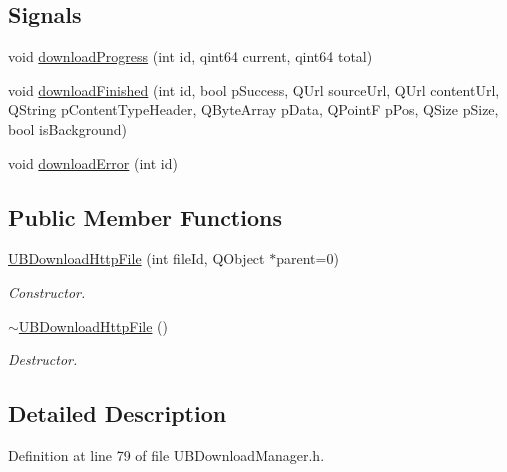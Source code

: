 \subsection*{Signals}
\begin{DoxyCompactItemize}
\item 
void \hyperlink{class_u_b_download_http_file_abf929cee75fc3b5401298b6757125480}{download\-Progress} (int id, qint64 current, qint64 total)
\item 
void \hyperlink{class_u_b_download_http_file_acd45974a11a39587251a7893894d85ee}{download\-Finished} (int id, bool p\-Success, Q\-Url source\-Url, Q\-Url content\-Url, Q\-String p\-Content\-Type\-Header, Q\-Byte\-Array p\-Data, Q\-Point\-F p\-Pos, Q\-Size p\-Size, bool is\-Background)
\item 
void \hyperlink{class_u_b_download_http_file_af8ea0f0a88ff715b70c6463906691fca}{download\-Error} (int id)
\end{DoxyCompactItemize}
\subsection*{Public Member Functions}
\begin{DoxyCompactItemize}
\item 
\hyperlink{class_u_b_download_http_file_a98850a9d46ab95f8c1dc9d62bede945a}{U\-B\-Download\-Http\-File} (int file\-Id, Q\-Object $\ast$parent=0)
\begin{DoxyCompactList}\small\item\em Constructor. \end{DoxyCompactList}\item 
\hyperlink{class_u_b_download_http_file_a7ba40f6b698ea416a921609f60981d89}{$\sim$\-U\-B\-Download\-Http\-File} ()
\begin{DoxyCompactList}\small\item\em Destructor. \end{DoxyCompactList}\end{DoxyCompactItemize}


\subsection{Detailed Description}


Definition at line 79 of file U\-B\-Download\-Manager.\-h.



